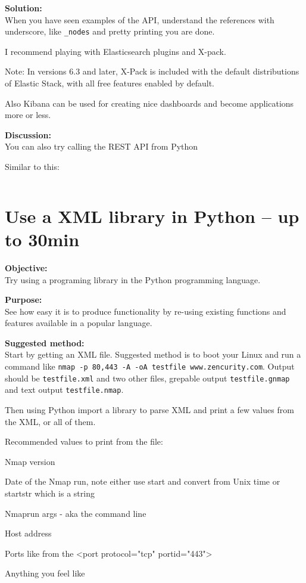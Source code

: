\documentclass[a4paper,11pt,notitlepage]{report}
\begin{document}
{\bf Solution:}\\
When you have seen examples of the API, understand the references with underscore, like \verb+_nodes+ and pretty printing you are done.

I recommend playing with Elasticsearch plugins and X-pack.\\

Note: In versions 6.3 and later, X-Pack is included with the default distributions of Elastic Stack, with all free features enabled by default.

Also Kibana can be used for creating nice dashboards and become applications more or less.

{\bf Discussion:}\\
You can also try calling the REST API from Python

Similar to this:
\inputminted{python}{programs/rest-1.py}








\chapter{Use a XML library in Python -- up to 30min}
\label{ex-python-library}

{\bf Objective:}\\
Try using a programing library in the Python programming language.

{\bf Purpose:}\\
See how easy it is to produce functionality by re-using existing functions and features available in a popular language.

{\bf Suggested method:}\\
Start by getting an XML file. Suggested method is to boot your Linux and run a command like \verb+nmap -p 80,443 -A -oA testfile www.zencurity.com+. Output should be \verb+testfile.xml+ and two other files, grepable output \verb+testfile.gnmap+ and text output \verb+testfile.nmap+.

Then using Python import a library to parse XML and print a few values from the XML, or all of them.

Recommended values to print from the file:
\begin{list2}
\item Nmap version
\item Date of the Nmap run, note either use start and convert from Unix time or startstr which is a string
\item Nmaprun args - aka the command line
\item Host address
\item Ports like from the <port protocol="tcp" portid="443">
\item Anything you feel like
\end{list2}
\end{document}
